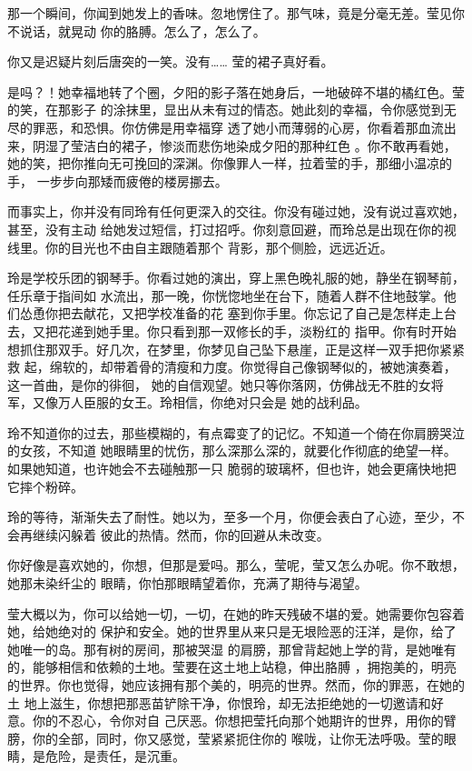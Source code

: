 \documentclass[12pt,a4paper]{article}
\begin{document}
		那一个瞬间，你闻到她发上的香味。忽地愣住了。那气味，竟是分毫无差。莹见你不说话，就晃动
	你的胳膊。怎么了，怎么了。

		你又是迟疑片刻后唐突的一笑。没有…… 莹的裙子真好看。

		是吗？！她幸福地转了个圈，夕阳的影子落在她身后，一地破碎不堪的橘红色。莹的笑，在那影子
	的涂抹里，显出从未有过的情态。她此刻的幸福，令你感觉到无尽的罪恶，和恐惧。你仿佛是用幸福穿
	透了她小而薄弱的心房，你看着那血流出来，阴湿了莹洁白的裙子，惨淡而悲伤地染成夕阳的那种红色
	。你不敢再看她，她的笑，把你推向无可挽回的深渊。你像罪人一样，拉着莹的手，那细小温凉的手，
	一步步向那矮而疲倦的楼房挪去。


		而事实上，你并没有同玲有任何更深入的交往。你没有碰过她，没有说过喜欢她，甚至，没有主动
	给她发过短信，打过招呼。你刻意回避，而玲总是出现在你的视线里。你的目光也不由自主跟随着那个
	背影，那个侧脸，远远近近。

		玲是学校乐团的钢琴手。你看过她的演出，穿上黑色晚礼服的她，静坐在钢琴前，任乐章于指间如
	水流出，那一晚，你恍惚地坐在台下，随着人群不住地鼓掌。他们怂恿你把去献花，又把学校准备的花
	塞到你手里。你忘记了自己是怎样走上台去，又把花递到她手里。你只看到那一双修长的手，淡粉红的
	指甲。你有时开始想抓住那双手。好几次，在梦里，你梦见自己坠下悬崖，正是这样一双手把你紧紧救
	起，绵软的，却带着骨的清瘦和力度。你觉得自己像钢琴似的，被她演奏着，这一首曲，是你的徘徊，
	她的自信观望。她只等你落网，仿佛战无不胜的女将军，又像万人臣服的女王。玲相信，你绝对只会是
	她的战利品。


		玲不知道你的过去，那些模糊的，有点霉变了的记忆。不知道一个倚在你肩膀哭泣的女孩，不知道
	她眼睛里的忧伤，那么深那么深的，就要化作彻底的绝望一样。如果她知道，也许她会不去碰触那一只
	脆弱的玻璃杯，但也许，她会更痛快地把它摔个粉碎。

		玲的等待，渐渐失去了耐性。她以为，至多一个月，你便会表白了心迹，至少，不会再继续闪躲着
	彼此的热情。然而，你的回避从未改变。

		你好像是喜欢她的，你想，但那是爱吗。那么，莹呢，莹又怎么办呢。你不敢想，她那未染纤尘的
	眼睛，你怕那眼睛望着你，充满了期待与渴望。

		莹大概以为，你可以给她一切，一切，在她的昨天残破不堪的爱。她需要你包容着她，给她绝对的
	保护和安全。她的世界里从来只是无垠险恶的汪洋，是你，给了她唯一的岛。那有树的房间，那被哭湿
	的肩膀，那曾背起她上学的背，是她唯有的，能够相信和依赖的土地。莹要在这土地上站稳，伸出胳膊
	，拥抱美的，明亮的世界。你也觉得，她应该拥有那个美的，明亮的世界。然而，你的罪恶，在她的土
	地上滋生，你想把那恶苗铲除干净，你恨玲，却无法拒绝她的一切邀请和好意。你的不忍心，令你对自
	己厌恶。你想把莹托向那个她期许的世界，用你的臂膀，你的全部，同时，你又感觉，莹紧紧扼住你的
	喉咙，让你无法呼吸。莹的眼睛，是危险，是责任，是沉重。
\end{document}
